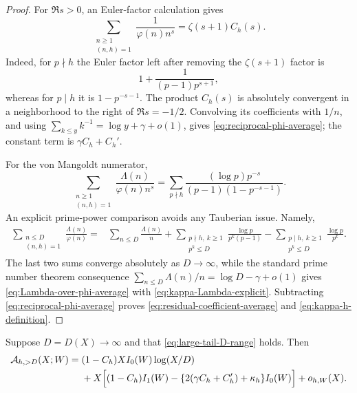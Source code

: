 \begin{proof}
For $\Re s>0$, an Euler-factor calculation gives
\begin{equation}\label{eq:phi-Dirichlet-series}
 \sum_{\substack{n\geq1\\(n,h)=1}}
 \frac1{\varphi(n)n^s}
 =\zeta(s+1)C_h(s).
\end{equation}
Indeed, for $p\nmid h$ the Euler factor left after removing the
$\zeta(s+1)$ factor is
\[
 1+\frac1{(p-1)p^{s+1}},
\]
whereas for $p\mid h$ it is $1-p^{-s-1}$.  The product $C_h(s)$ is
absolutely convergent in a neighborhood to the right of
$\Re s=-1/2$.  Convolving its coefficients with $1/n$, and using
$\sum_{k\leq y}k^{-1}=\log y+\gamma+o(1)$, gives
\eqref{eq:reciprocal-phi-average}; the constant term is
$\gamma C_h+C_h'$.

For the von Mangoldt numerator,
\begin{equation}\label{eq:Lambda-phi-Dirichlet-series}
 \sum_{\substack{n\geq1\\(n,h)=1}}
 \frac{\Lambda(n)}{\varphi(n)n^s}
 =\sum_{p\nmid h}
 \frac{(\log p)p^{-s}}
 {(p-1)(1-p^{-s-1})}.
\end{equation}
An explicit prime-power comparison avoids any Tauberian issue.  Namely,
\begin{align*}
 \sum_{\substack{n\leq D\\(n,h)=1}}\frac{\Lambda(n)}{\varphi(n)}
 ={}&\sum_{n\leq D}\frac{\Lambda(n)}n
 +\sum_{\substack{p\nmid h,\ k\geq1\\p^k\leq D}}
   \frac{\log p}{p^k(p-1)}
 -\sum_{\substack{p\mid h,\ k\geq1\\p^k\leq D}}
   \frac{\log p}{p^k}.
\end{align*}
The last two sums converge absolutely as $D\to\infty$, while the standard
prime number theorem consequence
$\sum_{n\leq D}\Lambda(n)/n=\log D-\gamma+o(1)$ gives
\eqref{eq:Lambda-over-phi-average} with
\eqref{eq:kappa-Lambda-explicit}.  Subtracting
\eqref{eq:reciprocal-phi-average} proves
\eqref{eq:residual-coefficient-average} and
\eqref{eq:kappa-h-definition}.
\end{proof}

\begin{corollary}
\label{cor:large-tail-shape}
Suppose $D=D(X)\to\infty$ and that \eqref{eq:large-tail-D-range} holds.
Then
\begin{align}
 \mathcal A_{h,>D}(X;W)
={}&(1-C_h)XI_0(W)\log(X/D)
 \notag\\
 &+X\Big[(1-C_h)I_1(W)
 -\{2(\gamma C_h+C_h')+\kappa_h\}I_0(W)\Big]
 +o_{h,W}(X).
 \label{eq:large-tail-shape}
\end{align}
\end{corollary}

